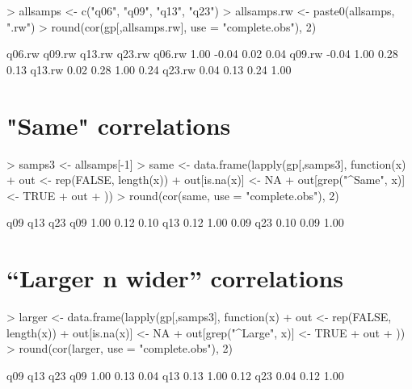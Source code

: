 \documentclass[11pt]{article}
\begin{document}
\begin{Schunk}
\begin{Sinput}
> allsamps <- c("q06", "q09", "q13", "q23")
> allsamps.rw <- paste0(allsamps, ".rw")
> round(cor(gp[,allsamps.rw], use = "complete.obs"), 2)
\end{Sinput}
\begin{Soutput}
       q06.rw q09.rw q13.rw q23.rw
q06.rw   1.00  -0.04   0.02   0.04
q09.rw  -0.04   1.00   0.28   0.13
q13.rw   0.02   0.28   1.00   0.24
q23.rw   0.04   0.13   0.24   1.00
\end{Soutput}
\end{Schunk}

\section{"Same" correlations}
\label{sec-6}

\begin{Schunk}
\begin{Sinput}
> samps3 <- allsamps[-1]
> same <- data.frame(lapply(gp[,samps3], function(x) {
+     out <- rep(FALSE, length(x))
+     out[is.na(x)] <- NA
+     out[grep("^Same", x)] <- TRUE
+     out
+ }))
> round(cor(same, use = "complete.obs"), 2)
\end{Sinput}
\begin{Soutput}
     q09  q13  q23
q09 1.00 0.12 0.10
q13 0.12 1.00 0.09
q23 0.10 0.09 1.00
\end{Soutput}
\end{Schunk}

\section{``Larger n wider'' correlations}
\label{sec-7}
\begin{Schunk}
\begin{Sinput}
> larger <- data.frame(lapply(gp[,samps3], function(x) {
+     out <- rep(FALSE, length(x))
+     out[is.na(x)] <- NA
+     out[grep("^Large", x)] <- TRUE
+     out
+ }))
> round(cor(larger, use = "complete.obs"), 2)
\end{Sinput}
\begin{Soutput}
     q09  q13  q23
q09 1.00 0.13 0.04
q13 0.13 1.00 0.12
q23 0.04 0.12 1.00
\end{Soutput}
\end{Schunk}
\end{document}
